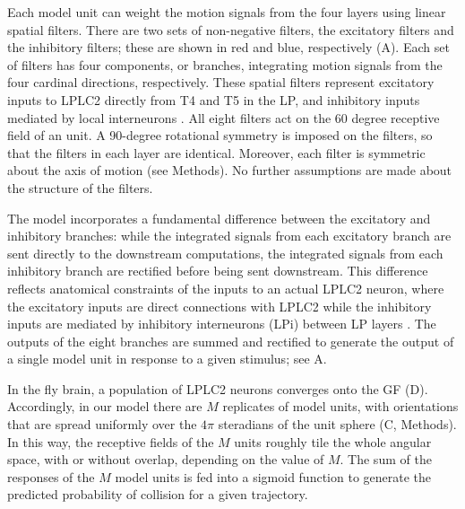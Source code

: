 \documentclass[pdftex,9pt,lineno]{elife}
\begin{document}
Each model unit can weight the motion signals from the four layers using linear spatial filters. There are two sets of non-negative filters, the excitatory filters and the inhibitory filters; these are shown in red and blue, respectively (A). Each set of filters has four components, or branches, integrating motion signals from the four cardinal directions, respectively. These spatial filters represent excitatory inputs to LPLC2 directly from T4 and T5 in the LP, and inhibitory inputs  mediated by local interneurons \citep{klapoetke2017ultra,mauss2015neural}. All eight filters act on the 60 degree receptive field of an unit. A 90-degree rotational symmetry is imposed on the filters, so that the filters in each layer are identical. Moreover, each filter is symmetric about the axis of motion (see Methods). No further assumptions are made about the structure of the filters.

The model incorporates a fundamental difference between the excitatory and inhibitory branches: while the integrated signals from each excitatory branch are sent directly to the downstream computations, the integrated signals from each inhibitory branch are rectified before being sent downstream. This difference reflects anatomical constraints of the inputs to an actual LPLC2 neuron, where the excitatory inputs are direct connections with LPLC2 while the inhibitory inputs are mediated by inhibitory interneurons (LPi) between LP layers \citep{mauss2015neural,klapoetke2017ultra}. The outputs of the eight branches are summed and rectified to generate the output of a single model unit in response to a given stimulus; see A.

In the fly brain, a population of LPLC2 neurons converges onto the GF (D). Accordingly, in our model there are $M$ replicates of model units, with orientations that are spread uniformly over the $4\pi$ steradians of the unit sphere (C, Methods). In this way, the receptive fields of the $M$ units roughly tile the whole angular space, with or without overlap, depending on the value of $M$. The sum of the responses of the $M$ model units is fed into a sigmoid function to generate the predicted probability of collision for a given trajectory.
\end{document}
